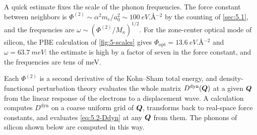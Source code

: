 A quick estimate fixes the scale of the phonon frequencies. The force constant between neighbors is $\Phi^{(2)} \sim \alpha^2m_e/a_0^2 \sim \SI{100}{eV.\angstrom^{-2}}$ by the counting of \cref{sec:5.1}, and the frequencies are $\omega \sim (\Phi^{(2)}/M_\kappa)^{1/2}$. For the zone-center optical mode of silicon, the PBE calculation of \cref{fig:5-scales} gives $\Phi_{\mathrm{opt}} = \SI{13.6}{eV.\angstrom^{-2}}$ and $\omega = \SI{63.7}{meV}$: the estimate is high by a factor of seven in the force constant, and the frequencies are tens of meV.

Each $\Phi^{(2)}$ is a second derivative of the Kohn--Sham total energy, and density-functional perturbation theory evaluates the whole matrix $D^{\mathrm{dyn}}(\bm{Q})$ at a given $\bm{Q}$ from the linear response of the electrons to a displacement wave. A calculation computes $D^{\mathrm{dyn}}$ on a coarse uniform grid of $\bm{Q}$, transforms back to real-space force constants, and evaluates \cref{eq:5.2-Ddyn} at any $\bm{Q}$ from them. The phonons of silicon shown below are computed in this way.

